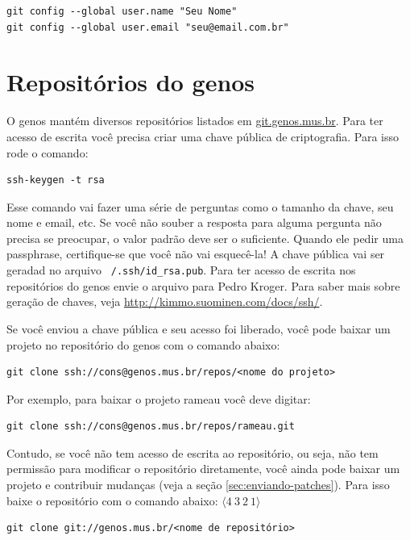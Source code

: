 \documentclass[12pt,brazil]{book}
\begin{document}
\begin{verbatim}
git config --global user.name "Seu Nome"
git config --global user.email "seu@email.com.br"
\end{verbatim}

\section{Repositórios do genos}
\label{sec:acesso-de-escrita}

O genos mantém diversos repositórios listados em
\url{git.genos.mus.br}. Para ter acesso de escrita você precisa criar
uma chave pública de criptografia. Para isso rode o comando:

\begin{verbatim}
ssh-keygen -t rsa
\end{verbatim}

Esse comando vai fazer uma série de perguntas como o tamanho da chave,
seu nome e email, etc. Se você não souber a resposta para alguma
pergunta não precisa se preocupar, o valor padrão deve ser o
suficiente. Quando ele pedir uma passphrase, certifique-se que você
não vai esquecê-la! A chave pública vai ser geradad no arquivo
\texttt{~/.ssh/id\_rsa.pub}. Para ter acesso de escrita nos
repositórios do genos envie o arquivo para Pedro Kroger. Para saber
mais sobre geração de chaves, veja
\url{http://kimmo.suominen.com/docs/ssh/}.

Se você enviou a chave pública e seu acesso foi liberado, você pode
baixar um projeto no repositório do genos com o comando abaixo:

\begin{verbatim}
git clone ssh://cons@genos.mus.br/repos/<nome do projeto>
\end{verbatim}

Por exemplo, para baixar o projeto rameau você deve
digitar:

\begin{verbatim}
git clone ssh://cons@genos.mus.br/repos/rameau.git
\end{verbatim}

Contudo, se você não tem acesso de escrita ao repositório, ou seja,
não tem permissão para modificar o repositório diretamente, você ainda
pode baixar um projeto e contribuir mudanças (veja a seção
\ref{sec:enviando-patches}). Para isso baixe o repositório com o
comando abaixo:
$\langle 4 \: 3\:  2\: 1 \rangle$
\begin{verbatim}
git clone git://genos.mus.br/<nome de repositório>
\end{verbatim}
\end{document}

